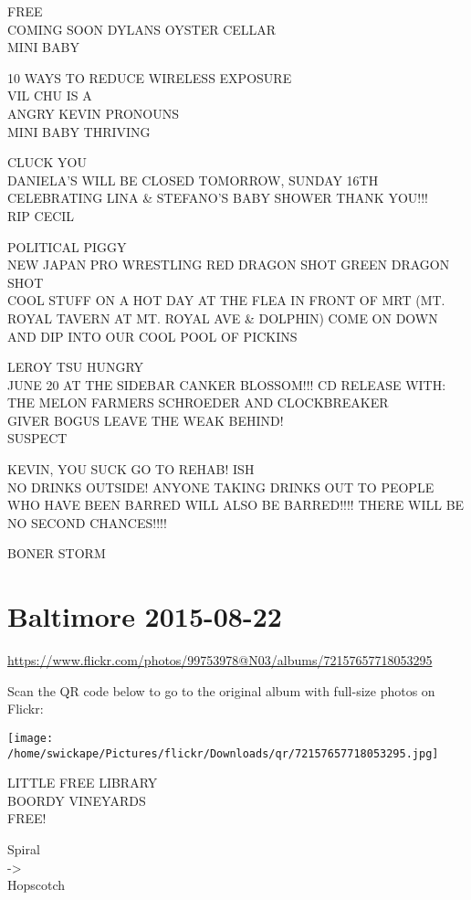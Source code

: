 \documentclass[10pt,letterpaper]{article}
\begin{document}
FREE\\
COMING SOON DYLANS OYSTER CELLAR\\
MINI BABY

10 WAYS TO REDUCE WIRELESS EXPOSURE\\
VIL CHU IS A\\
ANGRY KEVIN PRONOUNS\\
MINI BABY THRIVING

CLUCK YOU\\
DANIELA'S WILL BE CLOSED TOMORROW, SUNDAY 16TH CELEBRATING LINA \& STEFANO'S BABY SHOWER THANK YOU!!!\\
RIP CECIL

POLITICAL PIGGY\\
NEW JAPAN PRO WRESTLING RED DRAGON SHOT GREEN DRAGON SHOT\\
COOL STUFF ON A HOT DAY AT THE FLEA IN FRONT OF MRT (MT. ROYAL TAVERN AT MT. ROYAL AVE \& DOLPHIN) COME ON DOWN AND DIP INTO OUR COOL POOL OF PICKINS

LEROY TSU HUNGRY\\
JUNE 20 AT THE SIDEBAR CANKER BLOSSOM!!! CD RELEASE WITH: THE MELON FARMERS SCHROEDER AND CLOCKBREAKER\\
GIVER BOGUS LEAVE THE WEAK BEHIND!\\
SUSPECT

KEVIN, YOU SUCK GO TO REHAB! ISH\\
NO DRINKS OUTSIDE!  ANYONE TAKING DRINKS OUT TO PEOPLE WHO HAVE BEEN BARRED WILL ALSO BE BARRED!!!! THERE WILL BE NO SECOND CHANCES!!!!

BONER STORM
\pagebreak

\section*{Baltimore 2015-08-22}

\url{https://www.flickr.com/photos/99753978@N03/albums/72157657718053295}

Scan the QR code below to go to the original album with full-size photos on Flickr:

\texttt{[image: /home/swickape/Pictures/flickr/Downloads/qr/72157657718053295.jpg]}
\pagebreak

LITTLE FREE LIBRARY\\
BOORDY VINEYARDS\\
FREE!

Spiral\\
{-}>\\
Hopscotch
\end{document}
